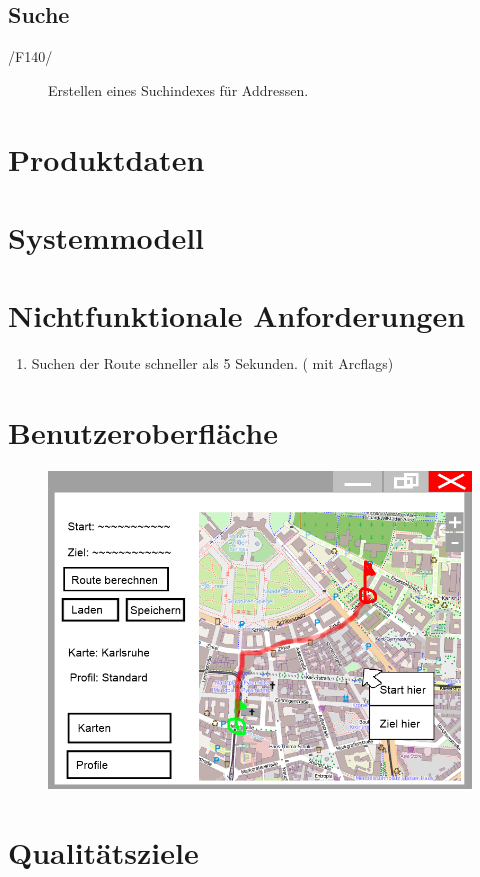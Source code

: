 \documentclass[a4paper, 11pt]{article}
\begin{document}
\subsection{Suche}
\begin{description}
\item[/F140/]
Erstellen eines Suchindexes für Addressen.

\end{description}
\section{Produktdaten}
\section{Systemmodell}
\section{Nichtfunktionale Anforderungen}

\begin{enumerate}
\item Suchen der Route schneller als 5 Sekunden. (  mit Arcflags)

\end{enumerate}
\section{Benutzeroberfläche}
\begin{figure}
\centering
\includegraphics[width=0.7\linewidth]{./mockup screenshot}
\caption[Erster Entwurf]{}
\caption{}
\label{fig:mockupscreenshot}
\end{figure}
\section{Qualitätsziele}
\end{document}
